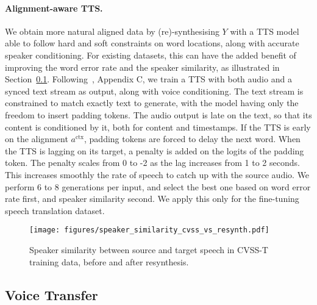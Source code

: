 \paragraph{Alignment-aware TTS.}
We obtain more natural aligned data by (re)-synthesising $Y$
with a TTS model able to follow hard and soft constraints on word locations,
along with accurate speaker conditioning.
For existing datasets, this can have the added benefit of improving the word error rate and the speaker similarity, as illustrated in Section~\ref{sec:voice_transfer}.
Following~\citep{moshi}, Appendix C, we train a TTS with both audio and a synced text stream as output, along with voice conditioning. The text stream is constrained to match
exactly text to generate, with the model having only the freedom to insert padding tokens. The audio output is late on the text, so that its content is
conditioned by it, both for content and timestamps. 
If the TTS is early on the alignment $a^{\textrm{ctx}}$, 
padding tokens are forced to delay the next word.
When the TTS is lagging on its target, a penalty
is added on the logits of the padding token. The penalty scales from 0 to -2 as
the lag increases from 1 to 2 seconds. This increases smoothly the rate of 
speech to catch up with the source audio.
We perform 6 to 8 generations per input, and select the best one based on
word error rate first, and speaker similarity second.
We apply this only for the fine-tuning speech translation dataset.

\begin{figure}[t]
        \centering
        \texttt{[image: figures/speaker\_similarity\_cvss\_vs\_resynth.pdf]}
    \caption{Speaker similarity between source and target speech in CVSS-T training data, before and after resynthesis.
    }
    \label{fig:speaker-sim-histogram}
\end{figure}

\subsection{Voice Transfer}
\label{sec:voice_transfer}
